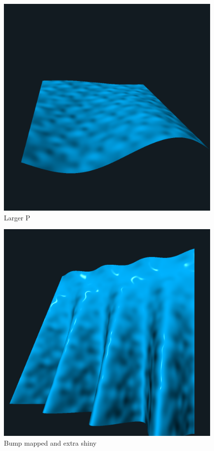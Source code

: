 \documentclass[12pt,letterpaper]{article}
\begin{document}
\begin{figure}[!h]
    \centering
    \includegraphics[width=1.0\textwidth]{img/larger_p.png}
    \caption{Larger P}
\end{figure}

\begin{figure}[!h]
    \centering
    \includegraphics[width=1.0\textwidth]{img/bump_shiny.png}
    \caption{Bump mapped and extra shiny}
\end{figure}
\end{document}
